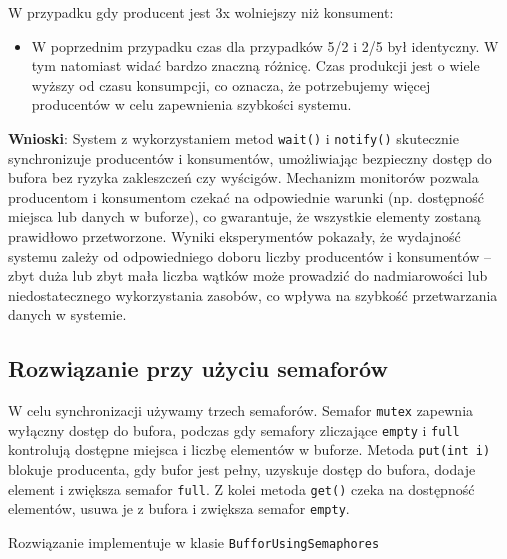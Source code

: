 \documentclass[11pt]{article}
\begin{document}
W przypadku gdy producent jest 3x wolniejszy niż konsument:
\begin{itemize}
\item W poprzednim przypadku czas dla  przypadków 5/2 i 2/5 był identyczny.
W tym natomiast widać bardzo znaczną różnicę. Czas produkcji jest o wiele wyższy od
czasu konsumpcji, co oznacza, że potrzebujemy więcej producentów w celu
zapewnienia szybkości systemu.
\end{itemize}


\textbf{Wnioski}:
System z wykorzystaniem metod \texttt{wait()} i \texttt{notify()} skutecznie synchronizuje
producentów i konsumentów, umożliwiając bezpieczny dostęp do bufora bez ryzyka
zakleszczeń czy wyścigów. Mechanizm monitorów pozwala producentom i konsumentom
czekać na odpowiednie warunki (np. dostępność miejsca lub danych w buforze), co
gwarantuje, że wszystkie elementy zostaną prawidłowo przetworzone. Wyniki
eksperymentów pokazały, że wydajność systemu zależy od odpowiedniego doboru
liczby producentów i konsumentów – zbyt duża lub zbyt mała liczba wątków może
prowadzić do nadmiarowości lub niedostatecznego wykorzystania zasobów, co wpływa
na szybkość przetwarzania danych w systemie.
\subsection*{Rozwiązanie przy użyciu semaforów}
\label{sec:org4ec23ad}
W celu synchronizacji używamy trzech semaforów. Semafor \texttt{mutex} zapewnia wyłączny
dostęp do bufora, podczas gdy semafory zliczające \texttt{empty} i \texttt{full} kontrolują
dostępne miejsca i liczbę elementów w buforze. Metoda \texttt{put(int i)} blokuje
producenta, gdy bufor jest pełny, uzyskuje dostęp do bufora, dodaje element i
zwiększa semafor \texttt{full}. Z kolei metoda \texttt{get()} czeka na dostępność elementów, usuwa
je z bufora i zwiększa semafor \texttt{empty}.

Rozwiązanie implementuje w klasie \texttt{BufforUsingSemaphores}
\end{document}
